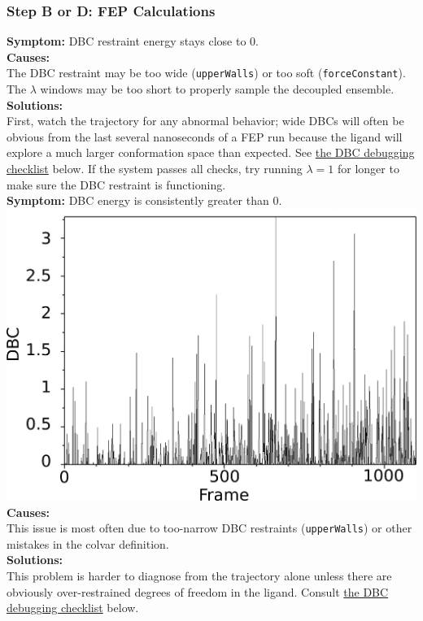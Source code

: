 \documentclass[9pt,tutorial,pubversion]{Styling/livecoms}
\newcommand{\textInput}[1]{\texttt{#1}}
\begin{document}
\subsubsection{Step B or D: FEP Calculations}\label{sec:debugFEP}
\noindent\textbf{Symptom:}  DBC restraint energy stays close to 0.\\
\textbf{Causes:}\\
The DBC restraint may be too wide (\textInput{upperWalls}) or too soft (\textInput{forceConstant}). The $\lambda$ windows may be too short to properly sample the decoupled ensemble.\\
\textbf{Solutions:}\\
First, watch the trajectory for any abnormal behavior; wide DBCs will often be obvious from the last several nanoseconds of a FEP run because the ligand will explore a much larger conformation space than expected. See \hyperref[list:DBCdebug]{the DBC debugging checklist} below. If the system passes all checks, try running $\lambda=1$ for longer to make sure the DBC restraint is functioning.\\

\noindent\textbf{Symptom:} DBC energy is consistently greater than 0.\\
\includegraphics[width=0.9\linewidth]{tightDBC_alchsite.png}
\textbf{Causes:}\\
This issue is most often due to too-narrow DBC restraints (\textInput{upperWalls}) or other mistakes in the colvar definition.\\
\textbf{Solutions:}\\
This problem is harder to diagnose from the trajectory alone unless there are obviously over-restrained degrees of freedom in the ligand. Consult \hyperref[list:DBCdebug]{the DBC debugging checklist} below.\\
\end{document}
